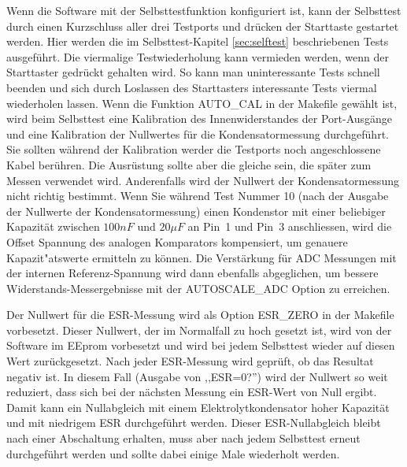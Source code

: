 Wenn die Software mit der Selbsttestfunktion konfiguriert ist, kann der Selbsttest durch einen Kurzschluss aller drei
Testports und drücken der Starttaste gestartet werden.
Hier werden die im Selbsttest-Kapitel \ref{sec:selftest} beschriebenen Tests ausgeführt. Die viermalige Testwiederholung
kann vermieden werden, wenn der Starttaster gedrückt gehalten wird. So kann man uninteressante Tests schnell beenden und
sich durch Loslassen des Starttasters interessante Tests viermal wiederholen lassen.
Wenn die Funktion AUTO\_CAL in der Makefile gewählt ist, wird beim Selbsttest
eine Kalibration des Innenwiderstandes der Port-Ausgänge und
eine Kalibration der Nullwertes für die Kondensatormessung durchgeführt.
Sie sollten während der Kalibration werder die Testports noch angeschlossene Kabel berühren. Die Ausrüstung
sollte aber die gleiche sein, die später zum Messen verwendet wird.
Anderenfalls wird der Nullwert der Kondensatormessung nicht richtig bestimmt.
Wenn Sie während Test Nummer 10 (nach der Ausgabe der Nullwerte der Kondensatormessung) einen Kondenstor mit einer beliebiger
Kapazität zwischen \(100 nF\) und \(20 \mu F\) an Pin~1 und Pin~3  anschliessen,
wird die Offset Spannung des analogen Komparators kompensiert, um genauere Kapazit"atswerte ermitteln zu können.
Die Verstärkung für ADC Messungen mit der internen Referenz-Spannung wird dann ebenfalls abgeglichen, um
bessere Widerstands-Messergebnisse mit der AUTOSCALE\_ADC Option zu erreichen.


Der Nullwert für die ESR-Messung wird als Option ESR\_ZERO in der Makefile vorbesetzt. Dieser Nullwert, der im
Normalfall zu hoch gesetzt ist, wird von der Software im EEprom vorbesetzt und wird bei jedem Selbsttest
wieder auf diesen Wert zurückgesetzt.
Nach jeder ESR-Messung wird geprüft, ob das Resultat negativ ist. In diesem Fall (Ausgabe von ,,ESR=0?'') wird der Nullwert so weit
reduziert, dass sich bei der nächsten Messung ein ESR-Wert von Null ergibt. Damit kann ein Nullabgleich mit
einem Elektrolytkondensator hoher Kapazität und mit niedrigem ESR durchgeführt werden.
Dieser ESR-Nullabgleich bleibt nach einer Abschaltung erhalten, muss aber nach jedem Selbsttest erneut durchgeführt werden und
sollte dabei einige Male wiederholt werden.
